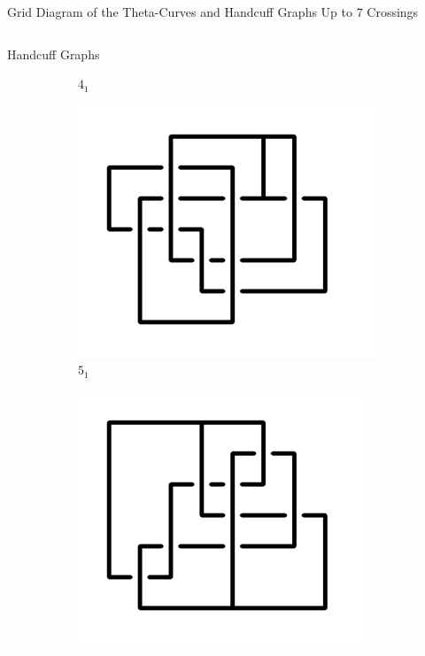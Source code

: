 \documentclass[final]{beamer}
\begin{document}
\begin{frame}[t]
\begin{alertblock}{Grid Diagram of the Theta-Curves and Handcuff Graphs Up to 7 Crossings}
\begin{columns}[t]
\begin{column}{0.5\textwidth}
\begin{alertblock}{Handcuff Graphs}
\begin{figure}
\begin{subfigure}{0.075\textwidth}
    \caption{$4_{1}$} 
    \end{subfigure}
    \begin{subfigure}{0.075\textwidth}
    \includegraphics[width=\columnwidth]{../Midterm_Poster/grid_diagram/handcuff_5_1.png}
    \caption{$5_{1}$} 
    \end{subfigure}
    \begin{subfigure}{0.075\textwidth}
    \includegraphics[width=\columnwidth]{../Midterm_Poster/grid_diagram/handcuff_6_1.png}

\end{subfigure}
\end{figure}
\end{alertblock}
\end{column}
\end{columns}
\end{alertblock}
\end{frame}
\end{document}
